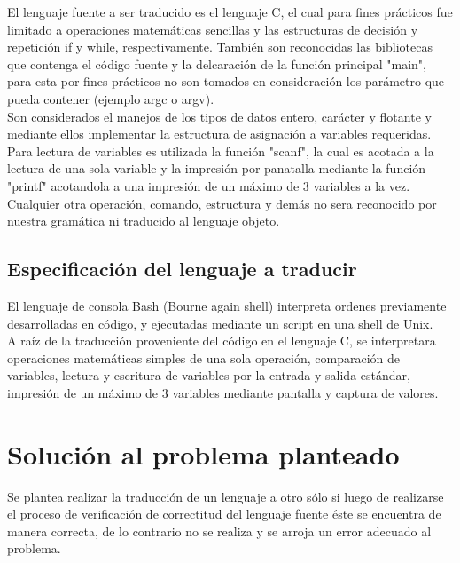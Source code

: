 \documentclass[aspectratio=169]{article}
\begin{document}
	El lenguaje fuente a ser traducido es el lenguaje C, el cual para fines pr\'acticos fue limitado a operaciones matemáticas sencillas y las estructuras de decisi\'on y repetici\'on if y while, respectivamente. Tambi\'en son reconocidas las bibliotecas que contenga el c\'odigo fuente y la delcaraci\'on de la funci\'on principal "main", para esta por fines pr\'acticos no son tomados en consideraci\'on los par\'ametro que pueda contener (ejemplo argc o argv). \\

	Son considerados el manejos de los tipos de datos entero, carácter y flotante y mediante ellos
	implementar la estructura de asignaci\'on a variables requeridas.\\

	Para lectura de variables es utilizada la funci\'on "scanf", la cual es acotada a la lectura
	de una sola variable y la impresi\'on por panatalla mediante la funci\'on "printf" acotandola a una impresi\'on de un m\'aximo de 3 variables a la vez. \\

	Cualquier otra operaci\'on, comando, estructura y demás no sera reconocido por nuestra gramática ni traducido al lenguaje objeto.

\subsection{Especificaci\'on del lenguaje a traducir}

	El lenguaje de consola Bash (Bourne again shell) interpreta ordenes previamente desarrolladas en c\'odigo, y ejecutadas mediante un script en una shell de Unix.\\

	A ra\'iz de la traducci\'on proveniente del c\'odigo en el lenguaje C, se interpretara operaciones matemáticas simples de una sola operación, comparación de variables, lectura y escritura de variables por la entrada y salida estándar, impresi\'on de un m\'aximo de 3 variables mediante pantalla y captura de valores.

\section{Soluci\'on al problema planteado}

	Se plantea realizar la traducción de un lenguaje a otro s\'olo si luego de realizarse el proceso de verificaci\'on de correctitud del lenguaje fuente \'este se encuentra de manera correcta, de lo contrario no se realiza y se arroja un error adecuado al problema.\\
\end{document}

